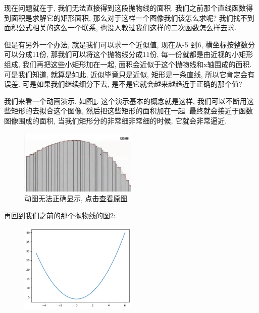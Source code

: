 现在问题就在于, 我们无法直接得到这段抛物线的面积. 我们之前那个直线函数得到面积是求解它的矩形面积, 那么对于这样一个图像我们该怎么求呢? 我们找不到面积公式相关的这么一个联系, 也没人教过我们这样的二次函数怎么样去求. 

但是有另外一个办法, 就是我们可以求一个近似值, 现在从-5 到6,  横坐标按整数分可以分成11份, 那我们可以将这个抛物线分成11份, 每一份就都是由近视的小矩形组成, 我们再把这些小矩形加在一起, 面积会近似于这个抛物线和x轴围成的面积. 可是我们知道, 就算是如此, 近似毕竟只是近似, 矩形是一条直线, 所以它肯定会有误差. 可是如果我们继续细分下去, 是不是它就会越来越趋近于正确的那个值? 

我们来看一个动画演示, 如图\ref{fig:img13_10}. 这个演示基本的概念就是这样, 我们可以不断用这些矩形的去拟合这个图像, 然后把这些矩形的面积加在一起. 最终就会接近于函数图像围成的面积, 当我们矩形分的非常细非常细的时候, 它就会非常逼近. 

\begin{figure}[ht]
  \centering
  \includegraphics[width=0.5\textwidth]{asset/截屏2023-12-31 16.27.12.png}
  \caption{动图无法正确显示, 点击\href{https://raw.githubusercontent.com/hivandu/notes/main/img/20230903155234.gif}{查看原图}}
  \label{fig:img13_10}
\end{figure}



再回到我们之前的那个抛物线的图\ref{fig:img13_11}:

\begin{figure}[ht]
  \centering
  \caption{}
  \label{fig:img13_11}
  \includegraphics[width=0.5\textwidth]{asset/20230903151121.png}
\end{figure}

